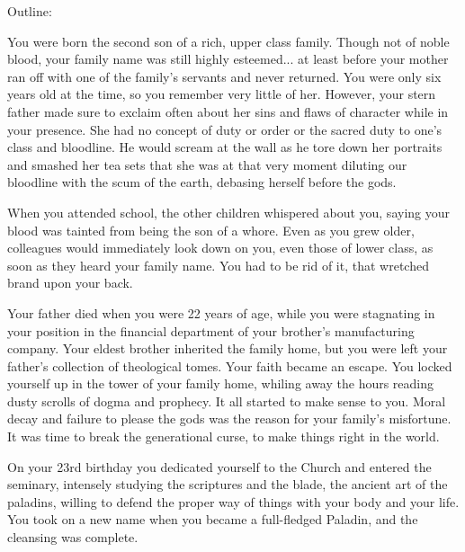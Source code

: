 \documentclass[char]{guildcamp3}
\begin{document}
\name{\cPaladin{}}

\updatemacro{\cNPC}{
  \unknownplayer %
  }



Outline:

You were born the second son of a rich, upper class family. Though not of noble blood, your family name was still highly esteemed... at least before your mother ran off with one of the family's servants and never returned. You were only six years old at the time, so you remember very little of her. However, your stern father made sure to exclaim often about her sins and flaws of character while in your presence. She had no concept of duty or order or the sacred duty to one's class and bloodline. He would scream at the wall as he tore down her portraits and smashed her tea sets that she was at that very moment diluting our bloodline with the scum of the earth, debasing herself before the gods.

When you attended school, the other children whispered about you, saying your blood was tainted from being the son of a whore. Even as you grew older, colleagues would immediately look down on you, even those of lower class, as soon as they heard your family name. You had to be rid of it, that wretched brand upon your back.

Your father died when you were 22 years of age, while you were stagnating in your position in the financial department of your brother's manufacturing company. Your eldest brother inherited the family home, but you were left your father's collection of theological tomes. Your faith became an escape. You locked yourself up in the tower of your family home, whiling away the hours reading dusty scrolls of dogma and prophecy. It all started to make sense to you. Moral decay and failure to please the gods was the reason for your family's misfortune. It was time to break the generational curse, to make things right in the world.

On your 23rd birthday you dedicated yourself to the Church and entered the seminary, intensely studying the scriptures and the blade, the ancient art of the paladins, willing to defend the proper way of things with your body and your life. You took on a new name when you became a full-fledged Paladin, and the cleansing was complete.
\end{document}
